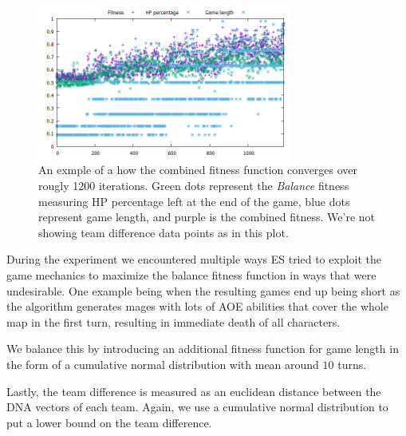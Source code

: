 \begin{figure}
	\centering
	\includegraphics[width=0.75\textwidth]{img/converging-es.png}
	\caption{An exmple of a how the combined fitness function converges over rougly 1200 iterations. Green dots represent the \emph{Balance} fitness measuring HP percentage left at the end of the game, blue dots represent game length, and purple is the combined fitness. We're not showing team difference data points as in this plot.}
	\label{fig:converging-es}	
\end{figure}


During the experiment we encountered multiple ways ES tried to exploit the
game mechanics to maximize the balance fitness function in ways that were
undesirable. One example being when the resulting games end up being short
as the algorithm generates mages with lots of AOE abilities that cover the
whole map in the first turn, resulting in immediate death of all characters.

We balance this by introducing an additional fitness function for game length
in the form of a cumulative normal distribution with mean around $10$ turns.

Lastly, the team difference is measured as an euclidean distance between the DNA
vectors of each team. Again, we use a cumulative normal distribution to put a lower
bound on the team difference.
